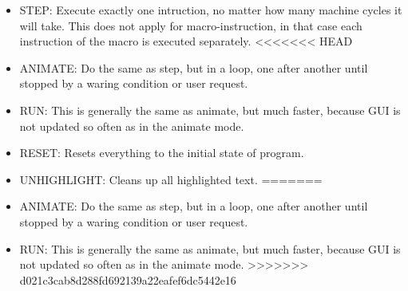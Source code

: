     \begin{itemize}
        \item STEP: Execute exactly one intruction, no matter how many machine cycles it will take. This does not apply for macro-instruction, in that case each instruction of the macro is executed separately.
<<<<<<< HEAD
        \item ANIMATE: Do the same as step, but in a loop, one after another until stopped by a waring condition or user request.
        \item RUN: This is generally the same as animate, but much faster, because GUI is not updated so often as in the animate mode.
        \item RESET: Resets everything to the initial state of program.
        \item UNHIGHLIGHT: Cleans up all highlighted text.
=======
        \item ANIMATE: Do the same as step, but in a loop, one after another until stopped by a waring condition or user request.
        \item RUN: This is generally the same as animate, but much faster, because GUI is not updated so often as in the animate mode.
>>>>>>> d021c3cab8d288fd692139a22eafef6dc5442e16
    \end{itemize}
